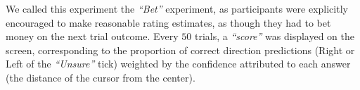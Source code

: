 \documentclass[12pt,english]{article}%
\begin{document}
We called this experiment the \textit{ ``Bet''} experiment, as participants were explicitly encouraged to make reasonable rating estimates, as though they had to bet money on the next trial outcome. Every $50$ trials, a \textit{``score''} was displayed on the screen, corresponding to the proportion of correct direction predictions (Right or Left of the \textit{``Unsure''} tick) weighted by the confidence attributed to each answer (the distance of the cursor from the center).




\end{document}
